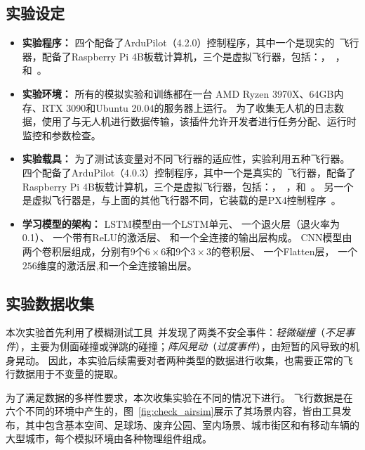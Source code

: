 \subsection{实验设定}
\begin{itemize}
\item \textbf{实验程序：} 
四个配备了ArduPilot（4.2.0）控制程序，其中一个是现实的~\cite{meier2011pixhawk}飞行器，配备了Raspberry Pi 4B板载计算机，三个是虚拟飞行器，包括：，~\cite{echeverria2011modular}，和~\cite{koenig2004design}。

\item \textbf{实验环境：}
所有的模拟实验和训练都在一台 AMD Ryzen 3970X、64GB内存、RTX 3090和Ubuntu 20.04的服务器上运行。
为了收集无人机的日志数据，\deccheck 使用了与无人机进行数据传输，该插件允许开发者进行任务分配、运行时监控和参数检查。

\item \textbf{实验载具：}
为了测试该变量对不同飞行器的适应性，实验利用五种飞行器。%
四个配备了ArduPilot（4.0.3）控制程序，其中一个是真实的~\cite{meier2011pixhawk}飞行器，配备了Raspberry Pi 4B板载计算机，三个是虚拟飞行器，包括：，~\cite{echeverria2011modular}，和~\cite{koenig2004design}。
另一个是虚拟飞行器是，与上面的其他飞行器不同，它装载的是PX4控制程序~\cite{px4}。

\item \textbf{学习模型的架构：}
LSTM模型由一个LSTM单元、
 一个退火层（退火率为0.1）、
一个带有ReLU的激活层、
    和一个全连接的输出层构成。
CNN模型由两个卷积层组成，分别有9个$6\times6$和9个$3\times3$的卷积层、
    一个Flatten层，
    一个$256$维度的激活层,和一个全连接输出层。
\end{itemize}


\subsection{实验数据收集}
本次实验首先利用了模糊测试工具~\cite{choi2020cyber}并发现了两类不安全事件：\emph{轻微碰撞}（\emph{不足事件}），主要为侧面碰撞或弹跳的碰撞；\emph{阵风晃动}（\emph{过度事件}），由短暂的风导致的机身晃动。
因此，本实验后续需要对者两种类型的数据进行收集，也需要正常的飞行数据用于不变量的提取。

为了满足数据的多样性要求，本次收集实验在不同的情况下进行。
飞行数据是在六个不同的环境中产生的，图~\ref{fig:check_airsim}展示了其场景内容，皆由工具发布，其中包含基本空间、足球场、废弃公园、室内场景、城市街区和有移动车辆的大型城市，每个模拟环境由各种物理组件组成。

